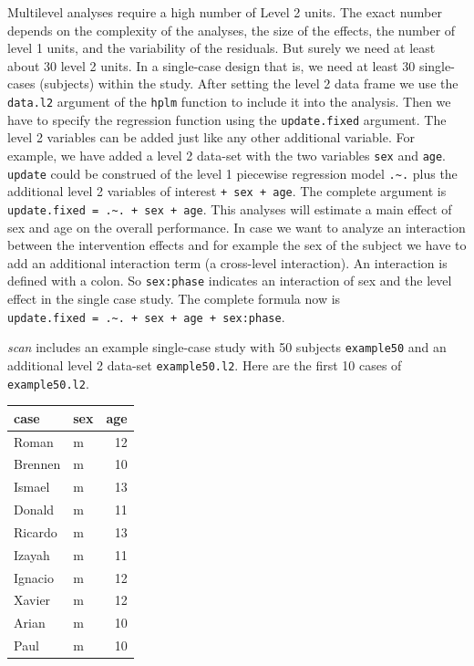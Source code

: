 \documentclass[
]{book}
\begin{document}
Multilevel analyses require a high number of Level 2 units. The exact number depends on the complexity of the analyses, the size of the effects, the number of level 1 units, and the variability of the residuals. But surely we need at least about 30 level 2 units. In a single-case design that is, we need at least 30 single-cases (subjects) within the study. After setting the level 2 data frame we use the \texttt{data.l2} argument of the \texttt{hplm} function to include it into the analysis. Then we have to specify the regression function using the \texttt{update.fixed} argument. The level 2 variables can be added just like any other additional variable. For example, we have added a level 2 data-set with the two variables \texttt{sex} and \texttt{age}. \texttt{update} could be construed of the level 1 piecewise regression model \texttt{.\textasciitilde{}.} plus the additional level 2 variables of interest \texttt{+\ sex\ +\ age}. The complete argument is \texttt{update.fixed\ =\ .\textasciitilde{}.\ +\ sex\ +\ age}. This analyses will estimate a main effect of sex and age on the overall performance. In case we want to analyze an interaction between the intervention effects and for example the sex of the subject we have to add an additional interaction term (a cross-level interaction). An interaction is defined with a colon. So \texttt{sex:phase} indicates an interaction of sex and the level effect in the single case study. The complete formula now is \texttt{update.fixed\ =\ .\textasciitilde{}.\ +\ sex\ +\ age\ +\ sex:phase}.

\emph{scan} includes an example single-case study with 50 subjects \texttt{example50} and an additional level 2 data-set \texttt{example50.l2}. Here are the first 10 cases of \texttt{example50.l2}.

\begin{tabular}{l|l|r}
\hline
case & sex & age\\
\hline
Roman & m & 12\\
\hline
Brennen & m & 10\\
\hline
Ismael & m & 13\\
\hline
Donald & m & 11\\
\hline
Ricardo & m & 13\\
\hline
Izayah & m & 11\\
\hline
Ignacio & m & 12\\
\hline
Xavier & m & 12\\
\hline
Arian & m & 10\\
\hline
Paul & m & 10\\
\hline
\end{tabular}
\end{document}
